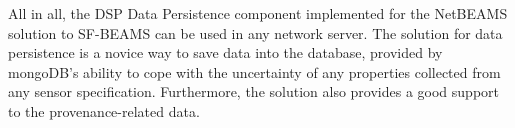 All in all, the DSP Data Persistence component implemented for the NetBEAMS
solution to SF-BEAMS can be used in any network server. The solution for data
persistence is a novice way to save data into the database, provided by
mongoDB's ability to cope with the uncertainty of any properties collected from
any sensor specification. Furthermore, the solution also provides a good
support to the provenance-related data.